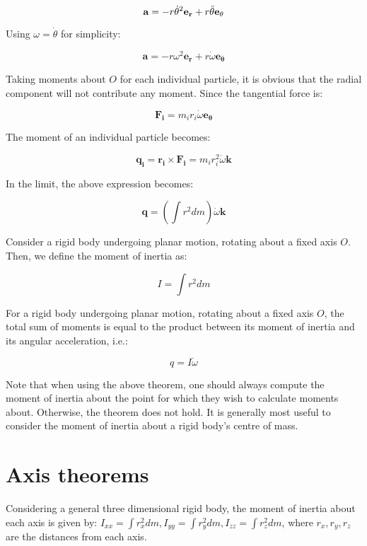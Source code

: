 \documentclass[12pt]{article}
\begin{document}
\[ \mathbf{a} = -r\dot{\theta}^2\mathbf{e_r} + r\Ddot{\theta}\mathbf{e_{\theta}} \]

Using $\omega = \dot{\theta}$ for simplicity:

\[ \mathbf{a} = -r\omega^2\mathbf{e_r} + r\dot{\omega}\mathbf{e_{\theta}} \]

Taking moments about $O$ for each individual particle, it is obvious that the radial component will not contribute any moment. Since the tangential force is:

\[ \mathbf{F_i} = m_ir_i\dot{\omega}\mathbf{e_{\theta}} \]

The moment of an individual particle becomes:

\[ \mathbf{q_i} = \mathbf{r_i} \times \mathbf{F_i} = m_ir_i^2\dot{\omega}\mathbf{k}\]

In the limit, the above expression becomes:

\[ \mathbf{q} = \left(\int r^2dm\right) \dot{\omega}\mathbf{k} \]

\begin{definition}
    Consider a rigid body undergoing planar motion, rotating about a fixed axis $O$. Then, we define the moment of inertia as:

    \[ I = \int r^2dm \]
\end{definition}

\begin{theorem}
    For a rigid body undergoing planar motion, rotating about a fixed axis $O$, the total sum of moments is equal to the product between its moment of inertia and its angular acceleration, i.e.:

    \[ q = I\dot{\omega} \]
\end{theorem}

Note that when using the above theorem, one should always compute the moment of inertia about the point for which they wish to calculate moments about. Otherwise, the theorem does not hold. It is generally most useful to consider the moment of inertia about a rigid body's centre of mass. 

\newpage

\section{Axis theorems}

Considering a general three dimensional rigid body, the moment of inertia about each axis is given by:
$I_{xx} = \int r_x^2dm, I_{yy} = \int r_y^2dm, I_{zz} = \int r_z^2dm$, where $r_x, r_y, r_z$ are the distances from each axis.
\end{document}
